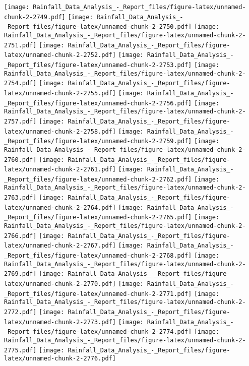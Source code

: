 \documentclass[
]{article}
\begin{document}
\texttt{[image: Rainfall\_Data\_Analysis\_-\_Report\_files/figure-latex/unnamed-chunk-2-2749.pdf]}
\texttt{[image: Rainfall\_Data\_Analysis\_-\_Report\_files/figure-latex/unnamed-chunk-2-2750.pdf]}
\texttt{[image: Rainfall\_Data\_Analysis\_-\_Report\_files/figure-latex/unnamed-chunk-2-2751.pdf]}
\texttt{[image: Rainfall\_Data\_Analysis\_-\_Report\_files/figure-latex/unnamed-chunk-2-2752.pdf]}
\texttt{[image: Rainfall\_Data\_Analysis\_-\_Report\_files/figure-latex/unnamed-chunk-2-2753.pdf]}
\texttt{[image: Rainfall\_Data\_Analysis\_-\_Report\_files/figure-latex/unnamed-chunk-2-2754.pdf]}
\texttt{[image: Rainfall\_Data\_Analysis\_-\_Report\_files/figure-latex/unnamed-chunk-2-2755.pdf]}
\texttt{[image: Rainfall\_Data\_Analysis\_-\_Report\_files/figure-latex/unnamed-chunk-2-2756.pdf]}
\texttt{[image: Rainfall\_Data\_Analysis\_-\_Report\_files/figure-latex/unnamed-chunk-2-2757.pdf]}
\texttt{[image: Rainfall\_Data\_Analysis\_-\_Report\_files/figure-latex/unnamed-chunk-2-2758.pdf]}
\texttt{[image: Rainfall\_Data\_Analysis\_-\_Report\_files/figure-latex/unnamed-chunk-2-2759.pdf]}
\texttt{[image: Rainfall\_Data\_Analysis\_-\_Report\_files/figure-latex/unnamed-chunk-2-2760.pdf]}
\texttt{[image: Rainfall\_Data\_Analysis\_-\_Report\_files/figure-latex/unnamed-chunk-2-2761.pdf]}
\texttt{[image: Rainfall\_Data\_Analysis\_-\_Report\_files/figure-latex/unnamed-chunk-2-2762.pdf]}
\texttt{[image: Rainfall\_Data\_Analysis\_-\_Report\_files/figure-latex/unnamed-chunk-2-2763.pdf]}
\texttt{[image: Rainfall\_Data\_Analysis\_-\_Report\_files/figure-latex/unnamed-chunk-2-2764.pdf]}
\texttt{[image: Rainfall\_Data\_Analysis\_-\_Report\_files/figure-latex/unnamed-chunk-2-2765.pdf]}
\texttt{[image: Rainfall\_Data\_Analysis\_-\_Report\_files/figure-latex/unnamed-chunk-2-2766.pdf]}
\texttt{[image: Rainfall\_Data\_Analysis\_-\_Report\_files/figure-latex/unnamed-chunk-2-2767.pdf]}
\texttt{[image: Rainfall\_Data\_Analysis\_-\_Report\_files/figure-latex/unnamed-chunk-2-2768.pdf]}
\texttt{[image: Rainfall\_Data\_Analysis\_-\_Report\_files/figure-latex/unnamed-chunk-2-2769.pdf]}
\texttt{[image: Rainfall\_Data\_Analysis\_-\_Report\_files/figure-latex/unnamed-chunk-2-2770.pdf]}
\texttt{[image: Rainfall\_Data\_Analysis\_-\_Report\_files/figure-latex/unnamed-chunk-2-2771.pdf]}
\texttt{[image: Rainfall\_Data\_Analysis\_-\_Report\_files/figure-latex/unnamed-chunk-2-2772.pdf]}
\texttt{[image: Rainfall\_Data\_Analysis\_-\_Report\_files/figure-latex/unnamed-chunk-2-2773.pdf]}
\texttt{[image: Rainfall\_Data\_Analysis\_-\_Report\_files/figure-latex/unnamed-chunk-2-2774.pdf]}
\texttt{[image: Rainfall\_Data\_Analysis\_-\_Report\_files/figure-latex/unnamed-chunk-2-2775.pdf]}
\texttt{[image: Rainfall\_Data\_Analysis\_-\_Report\_files/figure-latex/unnamed-chunk-2-2776.pdf]}
\end{document}
